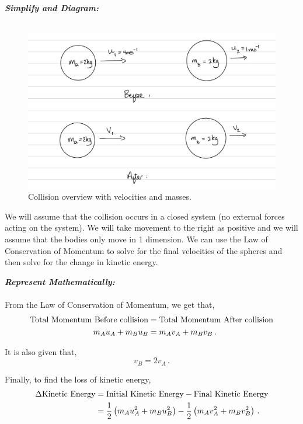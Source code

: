 \begin{subquestions}
\begin{subsubquestions}
\textbf{\textit{Simplify and Diagram:}} \\ \\
\begin{figure}[H]
	\begin{center}
		\includegraphics[scale=0.25]{../2007/figures/2008Mq5-1}
		\caption{\label{2008M:q5:Diagram1} Collision overview with velocities and masses.}
	\end{center}
\end{figure}
We will assume that the collision occurs in a closed system (no external forces acting on the system). We will take movement to the right as positive and we will assume that the bodies only move in 1 dimension. We can use the Law of Conservation of Momentum to solve for the final velocities of the spheres and then solve for the change in kinetic energy.




\textbf{\textit{Represent Mathematically:}} \\ \\
From the Law of Conservation of Momentum, we get that,
\begin{align}
	\text{Total Momentum Before collision} & = \text{Total Momentum After collision} \nonumber \\
	m_Au_A + m_Bu_B & = m_Av_A+m_Bv_B \label{2008M:q5:MomEqn1}\,.
\end{align}

It is also given that,
\begin{equation}
	v_B=2v_A \label{2008M:q5:Speed1} \,.
\end{equation}

Finally, to find the loss of kinetic energy,
\begin{align}
	\Delta \text{Kinetic Energy} & = \text{Initial Kinetic Energy} - \text{Final Kinetic Energy} \nonumber \\
	                             & = \frac{1}{2}\left(m_Au_A^2+m_Bu_B^2\right) - \frac{1}{2}\left(m_Av_A^2+m_Bv_B^2\right) \label{2008M:q5:KEEqn1} \,.
\end{align}




\end{subsubquestions}
\end{subquestions}
